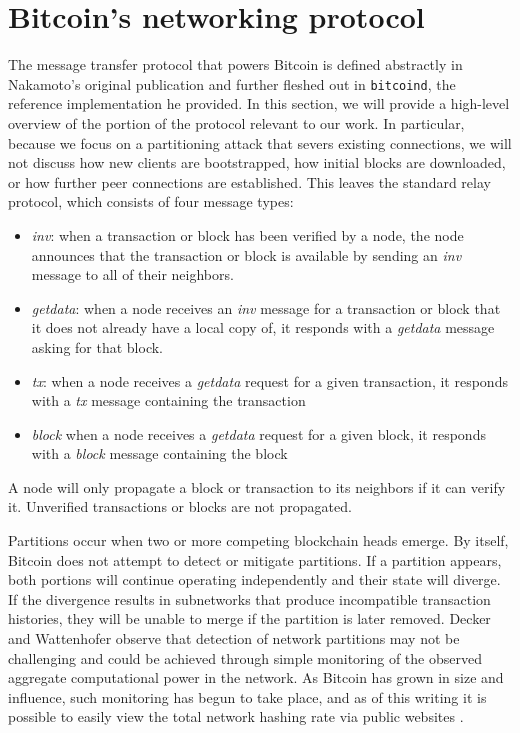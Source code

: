 \section{Bitcoin's networking protocol}
The message transfer protocol that powers Bitcoin is defined abstractly in Nakamoto's original publication \cite{Nakamoto} and further fleshed out in \texttt{bitcoind}, the reference implementation he provided. In this section, we will provide a high-level overview of the portion of the protocol relevant to our work. In particular, because we focus on a partitioning attack that severs existing connections, we will not discuss how new clients are bootstrapped, how initial blocks are downloaded, or how further peer connections are established. This leaves the standard relay protocol, which consists of four message types:

\begin{itemize}

\item \textit{inv}: when a transaction or block has been verified by a node, the node announces that the transaction or block is available by sending an \textit{inv} message to all of their neighbors.
\item \textit{getdata}: when a node receives an \textit{inv} message for a transaction or block that it does not already have a local copy of, it responds with a \textit{getdata} message asking for that block.
\item \textit{tx}: when a node receives a \textit{getdata} request for a given transaction, it responds with a \textit{tx} message containing the transaction
\item \textit{block} when a node receives a \textit{getdata} request for a given block, it responds with a \textit{block} message containing the block

\end{itemize}

A node will only propagate a block or transaction to its neighbors if it can verify it. Unverified transactions or blocks are not propagated.

Partitions occur when two or more competing blockchain heads emerge. 
By itself, Bitcoin does not attempt to detect or mitigate partitions. If a partition appears, both portions will continue operating independently and their state will diverge. If the divergence results in subnetworks that produce incompatible transaction histories, they will be unable to merge if the partition is later removed. Decker and Wattenhofer \cite{DeckerWattenhofer2013} observe that detection of network partitions may not be challenging and could be achieved through simple monitoring of the observed aggregate computational power in the network. As Bitcoin has grown in size and influence, such monitoring has begun to take place, and as of this writing it is possible to easily view the total network hashing rate via public websites \cite{sipa}.



